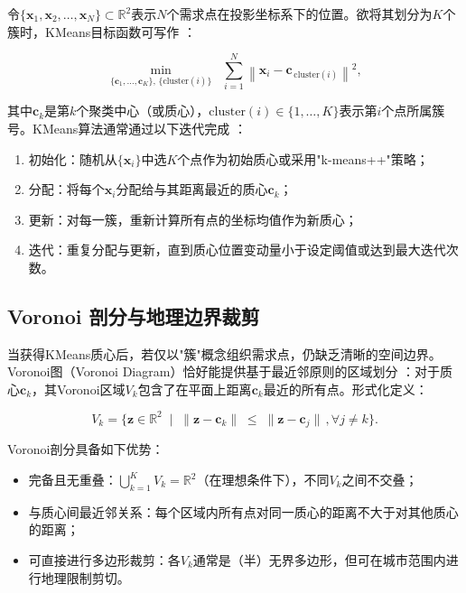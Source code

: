 \documentclass[12pt,a4paper,twoside]{ctexbook}
\begin{document}
令$\{\mathbf{x}_1,\mathbf{x}_2,\dots,\mathbf{x}_N\}\subset \mathbb{R}^2$表示$N$个需求点在投影坐标系下的位置。欲将其划分为$K$个簇时，KMeans目标函数可写作 \cite{Bishop2006}：

\begin{equation}
\min_{\{\mathbf{c}_1,\dots,\mathbf{c}_K\},\,\{\mathrm{cluster}(i)\}} \;\; \sum_{i=1}^{N} \left\| \mathbf{x}_i - \mathbf{c}_{\,\mathrm{cluster}(i)}\right\|^2,
\end{equation}

其中$\mathbf{c}_k$是第$k$个聚类中心（或质心），$\mathrm{cluster}(i)\in \{1,\dots,K\}$表示第$i$个点所属簇号。KMeans算法通常通过以下迭代完成 \cite{Arthur2007}：

\begin{enumerate}
    \item 初始化：随机从$\{\mathbf{x}_i\}$中选$K$个点作为初始质心或采用"k-means++"策略；
    \item 分配：将每个$\mathbf{x}_i$分配给与其距离最近的质心$\mathbf{c}_k$；
    \item 更新：对每一簇，重新计算所有点的坐标均值作为新质心；
    \item 迭代：重复分配与更新，直到质心位置变动量小于设定阈值或达到最大迭代次数。
\end{enumerate}

\subsection{Voronoi 剖分与地理边界裁剪}

当获得KMeans质心后，若仅以"簇"概念组织需求点，仍缺乏清晰的空间边界。Voronoi图（Voronoi Diagram）恰好能提供基于最近邻原则的区域划分 \cite{Aurenhammer1991}：对于质心$\mathbf{c}_k$，其Voronoi区域$V_k$包含了在平面上距离$\mathbf{c}_k$最近的所有点。形式化定义：

\begin{equation}
V_k = \bigl\{\mathbf{z} \in \mathbb{R}^2\;\mid\; \|\mathbf{z}-\mathbf{c}_k\|\;\le\;\|\mathbf{z}-\mathbf{c}_j\|\,, \forall j \neq k \bigr\}.
\end{equation}

Voronoi剖分具备如下优势：
\begin{itemize}
    \item 完备且无重叠：$\bigcup_{k=1}^K V_k = \mathbb{R}^2$（在理想条件下），不同$V_k$之间不交叠；
    \item 与质心间最近邻关系：每个区域内所有点对同一质心的距离不大于对其他质心的距离；
    \item 可直接进行多边形裁剪：各$V_k$通常是（半）无界多边形，但可在城市范围内进行地理限制剪切。
\end{itemize}
\end{document}
